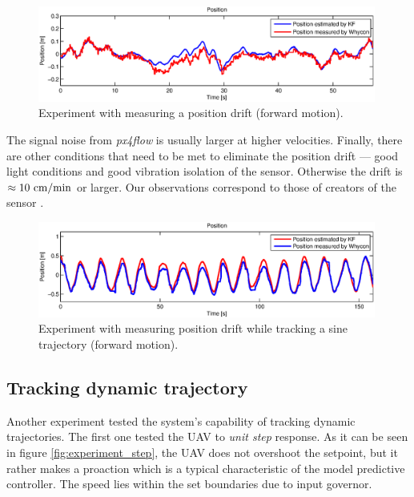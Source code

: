 \begin{figure}[H]
\centering
\includegraphics[width=0.99\textwidth]{fig/experiment5_drift_constant.eps}
\caption{Experiment with measuring a position drift (forward motion).}
\label{fig:experiment_drift_constant}
\end{figure}

The signal noise from \emph{px4flow} is usually larger at higher velocities. Finally, there are other conditions that need to be met to eliminate the position drift --- good light conditions and good vibration isolation of the sensor. Otherwise the drift is $\approx 10~\mathrm{cm/min}$ or larger. Our observations correspond to those of creators of the sensor \citep{honegger2013open}.

\begin{figure}[H]
\centering
\includegraphics[width=0.99\textwidth]{fig/experiment5_drift_sine.eps}
\caption{Experiment with measuring position drift while tracking a sine trajectory (forward motion).}
\label{fig:experiment_drift_sine}
\end{figure}

\subsection{Tracking dynamic trajectory}
\label{cap:dynamic_trajectory_tracking}

Another experiment tested the system's capability of tracking dynamic trajectories. The first one tested the UAV to \emph{unit step} response. As it can be seen in figure \ref{fig:experiment_step}, the UAV does not overshoot the setpoint, but it rather makes a proaction which is a typical characteristic of the model predictive controller. The speed lies within the set boundaries due to input governor.

